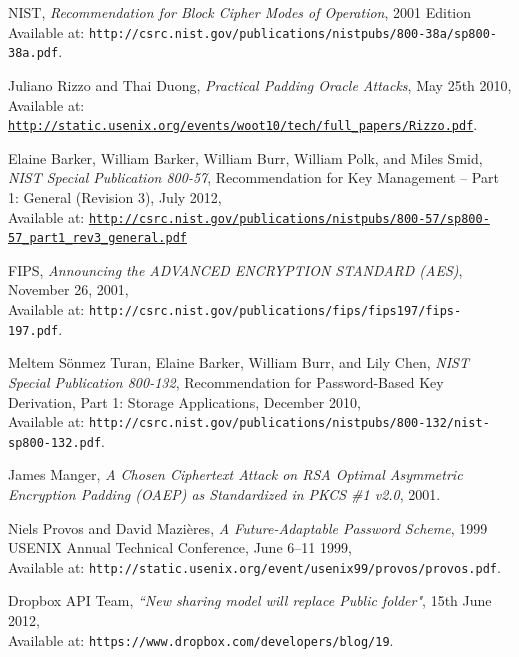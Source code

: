 \documentclass[12pt, titlepage]{article}
\begin{document}
\begin{thebibliography}{10}
NIST, \emph{Recommendation for Block Cipher Modes of Operation}, 2001 Edition
\\ Available at: \texttt{http://csrc.nist.gov/publications/nistpubs/800-38a/sp800-38a.pdf}.

Juliano Rizzo and Thai Duong, \emph{Practical Padding Oracle Attacks}, May 25th 2010,
\\ Available at: \texttt{\url{http://static.usenix.org/events/woot10/tech/full_papers/Rizzo.pdf}}.


Elaine Barker, William Barker, William Burr, William Polk, and Miles Smid, \emph{NIST Special Publication 800-57}, Recommendation for Key Management – Part 1: General (Revision 3), July
2012,
\\ Available at: \texttt{\url{http://csrc.nist.gov/publications/nistpubs/800-57/sp800-57_part1_rev3_general.pdf}}

FIPS, \emph{Announcing the ADVANCED ENCRYPTION STANDARD (AES)}, November 26, 2001,
\\ Available at:
\texttt{http://csrc.nist.gov/publications/fips/fips197/fips-197.pdf}.

Meltem Sönmez Turan, Elaine Barker, William Burr, and Lily Chen, \emph{NIST Special Publication 800-132}, Recommendation for Password-Based Key Derivation, Part 1: Storage Applications, December 2010,
\\ Available at: \texttt{http://csrc.nist.gov/publications/nistpubs/800-132/nist-sp800-132.pdf}.

James Manger, \emph{A Chosen Ciphertext Attack on RSA Optimal Asymmetric Encryption Padding (OAEP) as Standardized in PKCS \#1 v2.0}, 2001.

Niels Provos and David Mazières, \emph{A Future-Adaptable Password Scheme}, 1999 USENIX Annual Technical Conference, June 6–11 1999,
\\ Available at: \texttt{http://static.usenix.org/event/usenix99/provos/provos.pdf}. 

Dropbox API Team, \emph{``New sharing model will replace Public folder"},  15th June 2012,
\\ Available at: \texttt{https://www.dropbox.com/developers/blog/19}.

\end{thebibliography}
\end{document}
